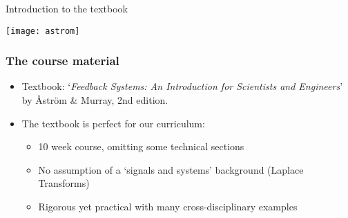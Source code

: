 \documentclass{beamer-control}
\begin{document}
\begin{frame}
\centering
\Large \alert{Introduction to the textbook}
\end{frame}

\begin{frame}
\texttt{[image: astrom]}
\end{frame}

\begin{frame}
\frametitle{The course material}
\begin{itemize}[<uncover@+->]
\item Textbook: `\emph{Feedback Systems: An Introduction for Scientists and Engineers}' by Åström \& Murray, 2nd edition.
\item The textbook is perfect for our curriculum:
\begin{itemize}
\item 10 week course, omitting some technical sections
\item No assumption of a `signals and systems' background (Laplace Transforms)
\item Rigorous yet practical with many cross-disciplinary examples
\end{itemize}
\end{itemize}
\end{frame}


\FINALE
\end{document}
